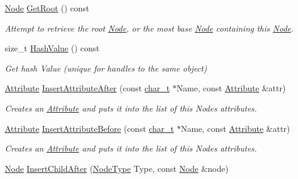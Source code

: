 \begin{DoxyCompactItemize}
\hyperlink{classphys_1_1xml_1_1Node}{Node} \hyperlink{classphys_1_1xml_1_1Node_a19eeb7427a38ea7d8543ed0ae8508b2c}{GetRoot} () const 
\begin{DoxyCompactList}\small\item\em Attempt to retrieve the root \hyperlink{classphys_1_1xml_1_1Node}{Node}, or the most base \hyperlink{classphys_1_1xml_1_1Node}{Node} containing this \hyperlink{classphys_1_1xml_1_1Node}{Node}. \item\end{DoxyCompactList}\item 
size\_\-t \hyperlink{classphys_1_1xml_1_1Node_a830a1833c4b4b012f1b4481e91ccb1ca}{HashValue} () const 
\begin{DoxyCompactList}\small\item\em Get hash Value (unique for handles to the same object) \item\end{DoxyCompactList}\item 
\hyperlink{classphys_1_1xml_1_1Attribute}{Attribute} \hyperlink{classphys_1_1xml_1_1Node_a8444ca5b7b7411fb9fc4c002ea7beb9e}{InsertAttributeAfter} (const \hyperlink{namespacephys_1_1xml_afc87705cd1c2917d87b879715a2d8f6e}{char\_\-t} $\ast$Name, const \hyperlink{classphys_1_1xml_1_1Attribute}{Attribute} \&attr)
\begin{DoxyCompactList}\small\item\em Creates an \hyperlink{classphys_1_1xml_1_1Attribute}{Attribute} and puts it into the list of this Nodes attributes. \item\end{DoxyCompactList}\item 
\hyperlink{classphys_1_1xml_1_1Attribute}{Attribute} \hyperlink{classphys_1_1xml_1_1Node_a0e4f1d13d8fb9c29068c01d8a0ac4217}{InsertAttributeBefore} (const \hyperlink{namespacephys_1_1xml_afc87705cd1c2917d87b879715a2d8f6e}{char\_\-t} $\ast$Name, const \hyperlink{classphys_1_1xml_1_1Attribute}{Attribute} \&attr)
\begin{DoxyCompactList}\small\item\em Creates an \hyperlink{classphys_1_1xml_1_1Attribute}{Attribute} and puts it into the list of this Nodes attributes. \item\end{DoxyCompactList}\item 
\hyperlink{classphys_1_1xml_1_1Node}{Node} \hyperlink{classphys_1_1xml_1_1Node_affc4d9cc0ea7c89bac58d91a432af2ef}{InsertChildAfter} (\hyperlink{namespacephys_1_1xml_a668b0cc666a9d49f7c7222a7552115d3}{NodeType} Type, const \hyperlink{classphys_1_1xml_1_1Node}{Node} \&node)

\end{DoxyCompactItemize}
